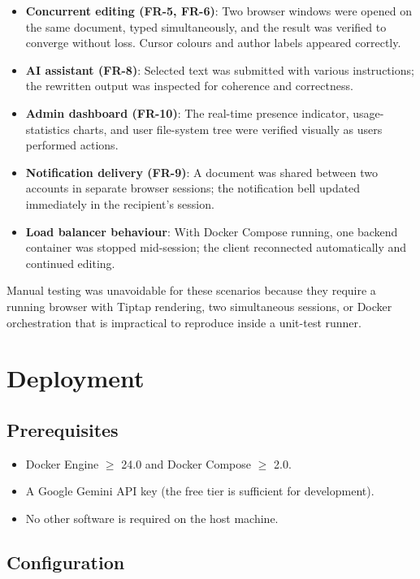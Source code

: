 \documentclass{scrartcl}
\begin{document}
  \begin{itemize}
    \item \textbf{Concurrent editing (FR-5, FR-6)}: Two browser windows were opened on the
    same document, typed simultaneously, and the result was verified to converge without loss.
    Cursor colours and author labels appeared correctly.
    \item \textbf{AI assistant (FR-8)}: Selected text was submitted with various instructions;
    the rewritten output was inspected for coherence and correctness.
    \item \textbf{Admin dashboard (FR-10)}: The real-time presence indicator, usage-statistics
    charts, and user file-system tree were verified visually as users performed actions.
    \item \textbf{Notification delivery (FR-9)}: A document was shared between two accounts in
    separate browser sessions; the notification bell updated immediately in the recipient's
    session.
    \item \textbf{Load balancer behaviour}: With Docker Compose running, one backend container
    was stopped mid-session; the client reconnected automatically and continued editing.
  \end{itemize}

  Manual testing was unavoidable for these scenarios because they require a running browser
  with Tiptap rendering, two simultaneous sessions, or Docker orchestration that is
  impractical to reproduce inside a unit-test runner.

  \section{Deployment}\label{deployment}

  \subsection{Prerequisites}

  \begin{itemize}
    \item Docker Engine $\geq$ 24.0 and Docker Compose $\geq$ 2.0.
    \item A Google Gemini API key (the free tier is sufficient for development).
    \item No other software is required on the host machine.
  \end{itemize}

  \subsection{Configuration}
\end{document}

